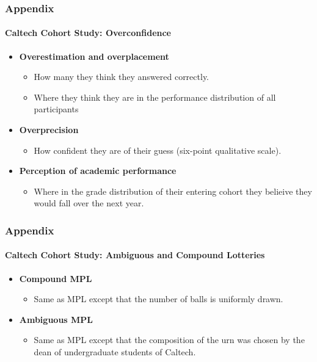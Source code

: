 \begin{frame}[noframenumbering]
\frametitle{Appendix}\label{app:cohort_over}
\framesubtitle{Caltech Cohort Study: Overconfidence}
\begin{itemize}
    \item \textbf{Overestimation and overplacement}
    \begin{itemize}
        \item How many they think they answered correctly.
        \item Where they think they are in the performance distribution of all participants
    \end{itemize}
    \item \textbf{Overprecision}
    \begin{itemize}
        \item How confident they are of their guess (six-point qualitative scale).
    \end{itemize}
    \item \textbf{Perception of academic performance}
    \begin{itemize}
        \item Where in the grade distribution of their entering cohort they belieive they would fall over the next year.
    \end{itemize}
\end{itemize}
\hyperlink{slide:cohort_risk}{}
\end{frame}

\begin{frame}[noframenumbering]
\frametitle{Appendix}\label{app:cohort_mpl}
\framesubtitle{Caltech Cohort Study: Ambiguous and Compound Lotteries}
\begin{itemize}
    \item \textbf{Compound MPL}
    \begin{itemize}
        \item Same as MPL except that the number of balls is uniformly drawn.
    \end{itemize}
    \item \textbf{Ambiguous MPL}
    \begin{itemize}
        \item Same as MPL except that the composition of the urn was chosen by the dean of undergraduate students of Caltech.
    \end{itemize}
\end{itemize}
\hyperlink{slide:cohort_risk}{}
\end{frame}

